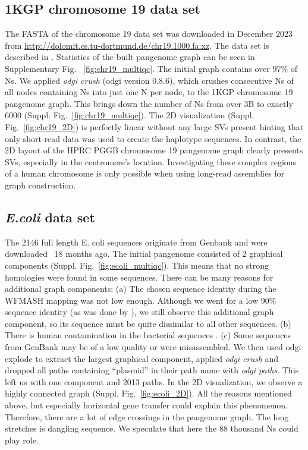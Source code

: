 \documentclass{bioinfo}
\theoremstyle{definition}
\begin{document}
	
	
	\subsection{1KGP chromosome 19 data set}
	
	The FASTA of the chromosome 19 data set was downloaded in December 2023 from \href{http://dolomit.cs.tu-dortmund.de/chr19.1000.fa.xz}{http://dolomit.cs.tu-dortmund.de/chr19.1000.fa.xz}. The data set is described in \citep{Kuhnle2020}. Statistics of the built pangenome graph can be seen in Supplementary Fig. ~\ref{fig:chr19_multiqc}. The initial graph contains over 97\% of Ns. We applied \textit{odgi crush} (odgi version 0.8.6), which crushes consecutive Ns of all nodes containing Ns into just one N per node, to the 1KGP chromosome 19 pangenome graph. This brings down the number of Ns from over 3B to exactly 6000 (Suppl. Fig.~\ref{fig:chr19_multiqc}). 
	The 2D visualization (Suppl. Fig.~\ref{fig:chr19_2D}) is perfectly linear without any large SVs present hinting that only short-read data was used to create the haplotype sequences.
	In contrast, the 2D layout of the HPRC PGGB chromosome 19 pangenome graph \citep{Heumos2024} clearly presents SVs, especially in the centromere's location. Investigating these complex regions of a human chromosome is only possible when using long-read assemblies for graph construction.
	
	
	
	
	\subsection{\textit{E.coli} data set}
	
	The 2146 full length E. coli sequences originate from Genbank \citep{Sayers2021} and were downloaded ~18 months ago. The initial pangenome consisted of 2 graphical components (Suppl. Fig.~\ref{fig:ecoli_multiqc}). This means that no strong homologies were found in some sequences. There can be many reasons for additional graph components: (a) The chosen sequence identity during the WFMASH mapping was not low enough. Although we went for a low 90\% sequence identity (as was done by \cite{Garrison2023}), we still observe this additional graph component, so its sequence must be quite dissimilar to all other sequences. (b) There is human contamination in the bacterial sequences \citep{Breitwieser2019}. (c) Some sequences from GenBank may be of a low quality or were misassembled. We then used odgi explode to extract the largest graphical component, applied \textit{odgi crush} and dropped all paths containing “plasmid” in their path name with \textit{odgi paths}. This left us with one component and 2013 paths.
	In the 2D visualization, we observe a highly connected graph (Suppl. Fig.~\ref{fig:ecoli_2D}). All the reasons mentioned above, but especially horizontal gene transfer could explain this phenomenon. Therefore, there are a lot of edge crossings in the pangenome graph. The long stretches is dangling sequence. We speculate that here the 88 thousand Ns could play role.
	
	
	
	
\end{document}
